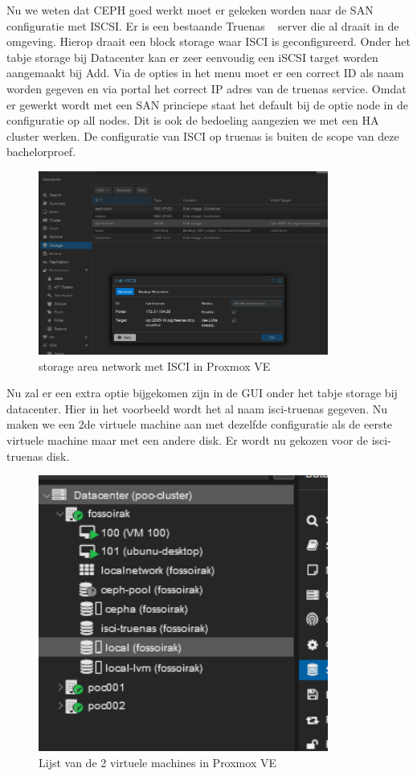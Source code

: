 Nu we weten dat CEPH goed werkt moet er gekeken worden naar de SAN configuratie met ISCSI.
Er is een bestaande Truenas ~\autocite{truenas} server die al draait in de omgeving. Hierop draait een block storage waar ISCI is geconfigureerd.
Onder het tabje storage  bij Datacenter kan er zeer eenvoudig een iSCSI target worden aangemaakt bij Add.
Via de opties in het menu moet er een correct ID als naam worden gegeven en via portal het correct IP adres van de truenas service.
Omdat er gewerkt wordt met een SAN princiepe staat het default bij de optie node in de configuratie op all nodes. Dit is ook de bedoeling aangezien we met een HA cluster werken.
De configuratie van ISCI op truenas is buiten de scope van deze bachelorproef.
\begin{figure}[H]
  \centering
  \includegraphics[width=0.85\textwidth]{../poc/iscsi-prox.png}
  \caption{storage area network met ISCI in Proxmox VE}
  \label{fig:iscsi-SAN}
\end{figure}
Nu zal er een extra  optie bijgekomen zijn in de GUI onder het tabje storage bij datacenter. Hier in het voorbeeld wordt het al naam isci-truenas gegeven.
Nu maken we een 2de virtuele machine aan met dezelfde configuratie als de eerste virtuele machine maar met een andere disk. Er wordt nu gekozen voor de isci-truenas disk.
\begin{figure}[H]
  \centering
  \includegraphics[width=0.85\textwidth]{../poc/vm-lijst-prox.png}
  \caption{Lijst van de 2 virtuele machines in Proxmox VE}
  \label{fig:vm-lijst}
\end{figure}

